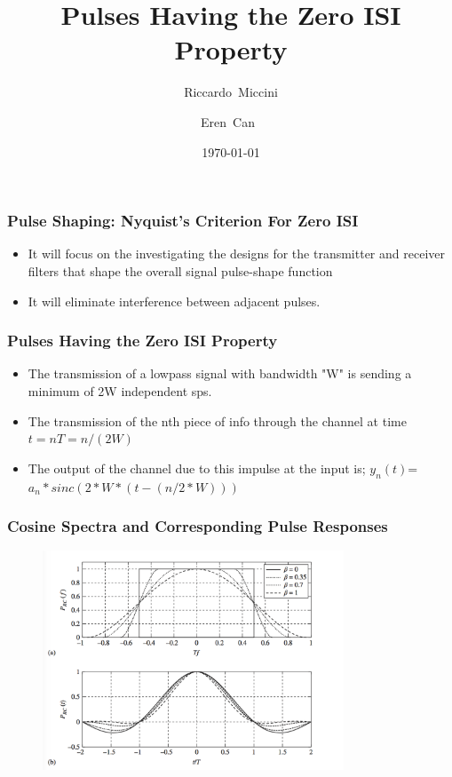 \documentclass{beamer}
\title{Pulses Having the Zero ISI Property}
\subtitle{}
\author[Riccardo \and Eren]{Riccardo~Miccini\inst{1} \and Eren~Can~\inst{1}}
\institute[DTU]
{
	\inst{1}
	Technical University of Denmark\\
	Digital Communication
}
\date{\today}
\begin{document}
	\frame{\titlepage}
	\begin{frame}
		\frametitle{Pulse Shaping: Nyquist's Criterion For Zero ISI}
	\begin{itemize}
	\item It will focus on the investigating the designs for the transmitter and receiver filters that shape the overall signal pulse-shape function
	\item It will eliminate interference between adjacent pulses.
	\end{itemize}
	\end{frame}
	\begin{frame}
		\frametitle{Pulses Having the Zero ISI Property}
		\begin{itemize}
			\item The transmission of a lowpass signal with bandwidth "W" is sending a minimum of 2W independent sps.
			\item The transmission of the nth piece of info through the channel at time $t= nT=n/(2W)$
			\item The output of the channel due to this impulse at the input is; $y_n(t)$=$ a_n *sinc(2*W*(t-(n/2*W)))$
			\end{itemize}
			\end{frame}
			\begin{frame}
			\frametitle{Cosine Spectra and Corresponding Pulse Responses}
			\begin{figure}
			\includegraphics[width=0.8\textwidth]{isi.png}
			\end{figure}
			\end{frame}
	
\end{document}
